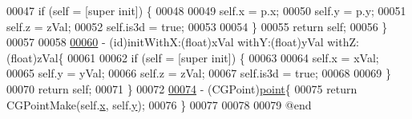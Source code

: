 \begin{DoxyCode}
00047     \textcolor{keywordflow}{if} (\textcolor{keyword}{self} = [super init]) \{
00048         
00049         \textcolor{keyword}{self}.x = p.x;
00050         \textcolor{keyword}{self}.y = p.y;
00051         \textcolor{keyword}{self}.z = zVal;
00052         \textcolor{keyword}{self}.is3d = \textcolor{keyword}{true};
00053         
00054     \}
00055     \textcolor{keywordflow}{return} \textcolor{keyword}{self};
00056 \}
00057 
00058 
\hypertarget{_simple_point_8mm_source_l00060}{}\hyperlink{interface_simple_point_afb23073d7d7146f85e0dec2029c962d0}{00060} - (id)initWithX:(\textcolor{keywordtype}{float})xVal withY:(\textcolor{keywordtype}{float})yVal withZ:(\textcolor{keywordtype}{float})zVal\{
00061     
00062     \textcolor{keywordflow}{if} (\textcolor{keyword}{self} = [super init]) \{
00063         
00064         \textcolor{keyword}{self}.x = xVal;
00065         \textcolor{keyword}{self}.y = yVal;
00066         \textcolor{keyword}{self}.z = zVal;
00067         \textcolor{keyword}{self}.is3d = \textcolor{keyword}{true};
00068         
00069     \}
00070     \textcolor{keywordflow}{return} \textcolor{keyword}{self};
00071 \}
00072 
\hypertarget{_simple_point_8mm_source_l00074}{}\hyperlink{interface_simple_point_a2f2ec1990349aa281ea9003c2d7e320b}{00074} - (CGPoint)\hyperlink{interface_simple_point_a2f2ec1990349aa281ea9003c2d7e320b}{point}\{
00075     \textcolor{keywordflow}{return} CGPointMake(\textcolor{keyword}{self}.\hyperlink{interface_simple_point_abb16aaf6215e9e946606b30199b1c3af}{x}, \textcolor{keyword}{self}.\hyperlink{interface_simple_point_ae10ba2c5156e6061258a0720443cd1c8}{y});
00076 \}
00077 
00078 
00079 \textcolor{keyword}{@end}
\end{DoxyCode}

